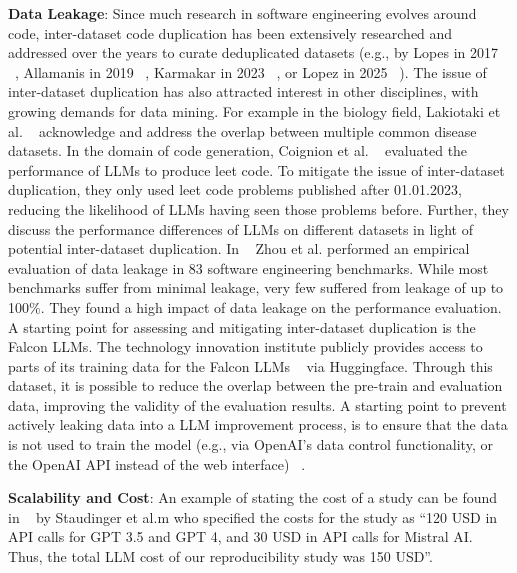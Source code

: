 \textbf{Data Leakage}:
Since much research in software engineering evolves around code, inter-dataset code duplication has been extensively researched and addressed over the years to curate deduplicated datasets (e.g., by Lopes in 2017 ~\cite{DBLP:journals/pacmpl/LopesMMSYZSV17}, Allamanis in 2019 ~\cite{10.1145/3359591.3359735}, Karmakar in 2023 ~\cite{DBLP:journals/ese/KarmakarAR23}, or Lopez in 2025 ~\cite{DBLP:journals/tse/LopezCSSV25}).
The issue of inter-dataset duplication has also attracted interest in other disciplines, with growing demands for data mining. For example in the biology field, Lakiotaki et al. ~\cite{DBLP:journals/biodb/LakiotakiVTGT18} acknowledge and address the overlap between multiple common disease datasets. 
In the domain of code generation, Coignion et al. ~\cite{DBLP:conf/ease/CoignionQR24} evaluated the performance of LLMs to produce leet code. To mitigate the issue of inter-dataset duplication, they only used leet code problems published after 01.01.2023, reducing the likelihood of LLMs having seen those problems before. Further, they discuss the performance differences of LLMs on different datasets in light of potential inter-dataset duplication.
In ~\cite{zhou2025lessleakbenchinvestigationdataleakage} Zhou et al. performed an empirical evaluation of data leakage in 83 software engineering benchmarks. While most benchmarks suffer from minimal leakage, very few suffered from leakage of up to 100\%. They found a high impact of data leakage on the performance evaluation.
A starting point for assessing and mitigating inter-dataset duplication is the Falcon LLMs. The technology innovation institute publicly provides access to parts of its training data for the Falcon LLMs ~\cite{technology_innovation_institute_2023} via Huggingface. Through this dataset, it is possible to reduce the overlap between the pre-train and evaluation data, improving the validity of the evaluation results.
A starting point to prevent actively leaking data into a LLM improvement process, is to ensure that the data is not used to train the model (e.g., via OpenAI's data control functionality, or the OpenAI API instead of the web interface) ~\cite{DBLP:conf/eacl/BalloccuSLD24}.

\textbf{Scalability and Cost}:
An example of stating the cost of a study can be found in ~\cite{DBLP:conf/sigir-ap/StaudingerKPLH24} by Staudinger et al.m who specified the costs for the study as \enquote{120 USD in API calls for GPT 3.5 and GPT 4, and 30 USD in API calls for Mistral AI. Thus, the total LLM cost of our reproducibility study was 150 USD}.

